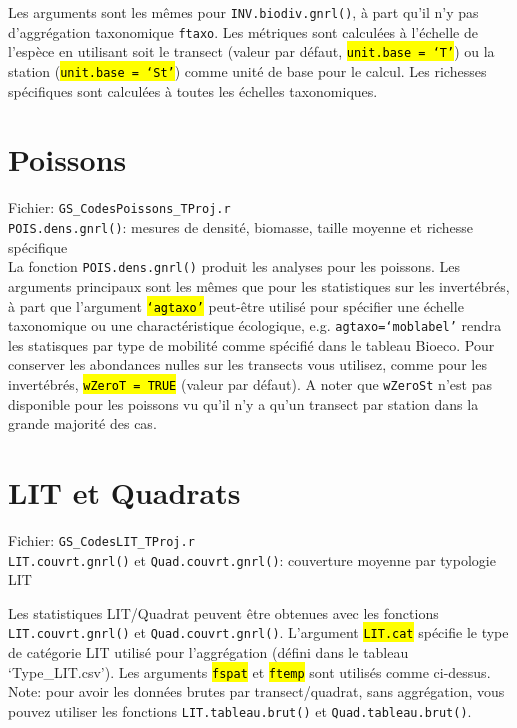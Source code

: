\documentclass{article}
\begin{document}
Les arguments sont les mêmes pour \texttt{INV.biodiv.gnrl()}, à part qu'il n'y
pas d'aggrégation taxonomique \texttt{ftaxo}. Les métriques sont calculées à
l'échelle de l'espèce en utilisant soit le transect (valeur par
défaut, \hl{\texttt{unit.base = `T'}}) ou la station
(\hl{\texttt{unit.base = `St'}}) comme unité de
base pour le calcul. Les richesses spécifiques sont calculées à toutes
les échelles taxonomiques.

\section{Poissons}
Fichier: \texttt{GS\_CodesPoissons\_TProj.r}\\
\texttt{POIS.dens.gnrl()}: mesures de densité, biomasse, taille
moyenne et richesse spécifique\\

La fonction \texttt{POIS.dens.gnrl()} produit les analyses pour
les poissons. Les arguments principaux sont les mêmes que pour les
statistiques sur
les invertébrés, à part que l'argument \hl{\texttt{`agtaxo'}} peut-être utilisé
pour spécifier une échelle taxonomique ou une charactéristique
écologique, e.g. \texttt{agtaxo=`moblabel'} rendra les statisques par
type de mobilité comme spécifié dans le tableau Bioeco. Pour conserver
les abondances nulles sur les transects vous utilisez, comme pour les
invertébrés, \hl{\texttt{wZeroT = TRUE}} (valeur par
défaut). A noter que \texttt{wZeroSt} n'est pas disponible pour les
poissons vu qu'il n'y a qu'un transect par station dans la grande majorité
des cas.

\section{LIT et Quadrats}
Fichier: \texttt{GS\_CodesLIT\_TProj.r}\\
\texttt{LIT.couvrt.gnrl()} et \texttt{Quad.couvrt.gnrl()}: couverture
moyenne par typologie LIT

Les statistiques LIT/Quadrat peuvent être obtenues avec les fonctions
\texttt{LIT.couvrt.gnrl()} et \texttt{Quad.couvrt.gnrl()}. L'argument
\hl{\texttt{LIT.cat}} spécifie
le type de catégorie LIT utilisé pour l'aggrégation (défini dans le
tableau `Type\_LIT.csv'). Les arguments \hl{\texttt{fspat}} et
\hl{\texttt{ftemp}} sont utilisés comme ci-dessus. Note: pour avoir les
données brutes par transect/quadrat, sans aggrégation, vous pouvez
utiliser les fonctions \texttt{LIT.tableau.brut()} et
\texttt{Quad.tableau.brut()}.
\end{document}
